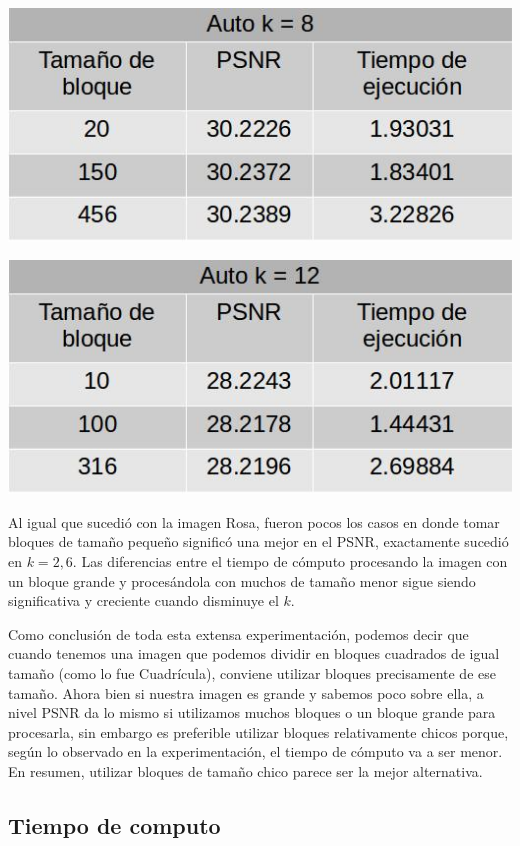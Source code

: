 \documentclass[a4paper]{article}
\begin{document}
\centerline{
\includegraphics[scale=0.5]{imagenes/autok8Tabla.jpg}
}
\vspace{1cm}

\centerline{
\includegraphics[scale=0.5]{imagenes/autok12Tabla.jpg}
}

Al igual que sucedió con la imagen Rosa, fueron pocos los casos en donde tomar bloques de tamaño pequeño significó una mejor en el PSNR, exactamente sucedió en $k = 2, 6$. Las diferencias entre el tiempo de cómputo procesando la imagen con un bloque grande y procesándola con muchos de tamaño menor sigue siendo significativa y creciente cuando disminuye el $k$.
\par Como conclusión de toda esta extensa experimentación, podemos decir que cuando tenemos una imagen que podemos dividir en bloques cuadrados de igual tamaño (como lo fue Cuadrícula), conviene utilizar bloques precisamente de ese tamaño. Ahora bien si nuestra imagen es grande y sabemos poco sobre ella, a nivel PSNR da lo mismo si utilizamos muchos bloques o un bloque grande para procesarla, sin embargo es preferible utilizar bloques relativamente chicos porque, según lo observado en la experimentación, el tiempo de cómputo va a ser menor. En resumen, utilizar bloques de tamaño chico parece ser la mejor alternativa.


\subsection{Tiempo de computo}
\end{document}
